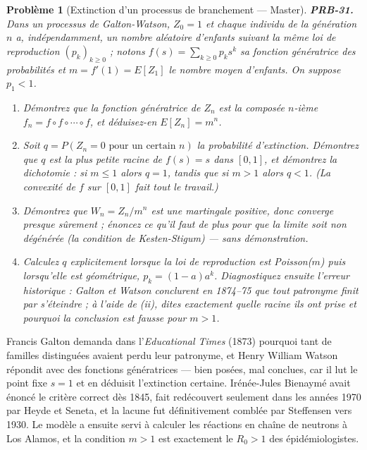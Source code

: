 \documentclass[11pt]{article}
\newtheorem{problem}{Problème}
\begin{document}
\bigskip

\begin{problem}[{Extinction d'un processus de branchement --- Master}]
\textbf{PRB-31.} Dans un processus de Galton-Watson, $ Z_0 = 1 $ et chaque individu de la
génération $ n $ a, indépendamment, un nombre aléatoire d'enfants suivant la même loi de
reproduction $ (p_k)_{k \ge 0} $ ; notons $ f(s) = \sum_{k \ge 0} p_k s^k $ sa fonction
génératrice des probabilités et $ m = f'(1) = E[Z_1] $ le nombre moyen d'enfants. On suppose
$ p_1 < 1 $.
\begin{enumerate}
\item[(i)] Démontrez que la fonction génératrice de $ Z_n $ est la composée $ n $-ième
$ f_n = f \circ f \circ \cdots \circ f $, et déduisez-en $ E[Z_n] = m^n $.
\item[(ii)] Soit $ q = P(Z_n = 0 \text{ pour un certain } n) $ la probabilité d'extinction. Démontrez que
$ q $ est la plus petite racine de $ f(s) = s $ dans $ [0,1] $, et démontrez la dichotomie :
si $ m \le 1 $ alors $ q = 1 $, tandis que si $ m > 1 $ alors $ q < 1 $. (La convexité
de $ f $ sur $ [0,1] $ fait tout le travail.)
\item[(iii)] Démontrez que $ W_n = Z_n / m^n $ est une martingale positive, donc converge presque
sûrement ; énoncez ce qu'il faut de plus pour que la limite soit non dégénérée (la condition de
Kesten-Stigum) --- sans démonstration.
\item[(iv)] Calculez $ q $ explicitement lorsque la loi de reproduction est Poisson($ m $) puis
lorsqu'elle est géométrique, $ p_k = (1-a)a^k $. Diagnostiquez ensuite l'erreur historique :
Galton et Watson conclurent en 1874--75 que \textit{tout} patronyme finit par s'éteindre ; à l'aide de
(ii), dites exactement quelle racine ils ont prise et pourquoi la conclusion est fausse pour
$ m > 1 $.
\end{enumerate}

\end{problem}

\noindent Francis Galton demanda dans l'\textit{Educational Times} (1873) pourquoi tant de
familles distinguées avaient perdu leur patronyme, et Henry William Watson répondit avec des
fonctions génératrices --- bien posées, mal conclues, car il lut le point fixe $ s = 1 $ et en
déduisit l'extinction certaine. Irénée-Jules Bienaymé avait énoncé le critère correct dès 1845,
fait redécouvert seulement dans les années 1970 par Heyde et Seneta, et la lacune fut définitivement
comblée par Steffensen vers 1930. Le modèle a ensuite servi à calculer les réactions en chaîne de
neutrons à Los Alamos, et la condition $ m > 1 $ est exactement le $ R_0 > 1 $ des
épidémiologistes.
\end{document}
